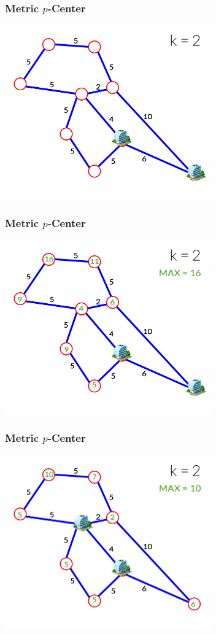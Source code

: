 \documentclass[12pt]{beamer}
\begin{document}
\begin{frame}
\frametitle{Metric $p$-Center}
\begin{center}
\includegraphics[height=75mm]{Images/metric4}\\
\end{center}
\end{frame}
\begin{frame}
\frametitle{Metric $p$-Center}
\begin{center}
\includegraphics[height=75mm]{Images/metric5}\\
\end{center}
\end{frame}
\begin{frame}
\frametitle{Metric $p$-Center}
\begin{center}
\includegraphics[height=75mm]{Images/metric6}\\
\end{center}
\end{frame}
\end{document}
